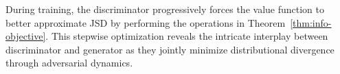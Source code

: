 During training, the discriminator progressively forces the value function to better approximate JSD by performing the operations in Theorem~\ref{thm:info-objective}. This stepwise optimization reveals the intricate interplay between discriminator and generator as they jointly minimize distributional divergence through adversarial dynamics.

